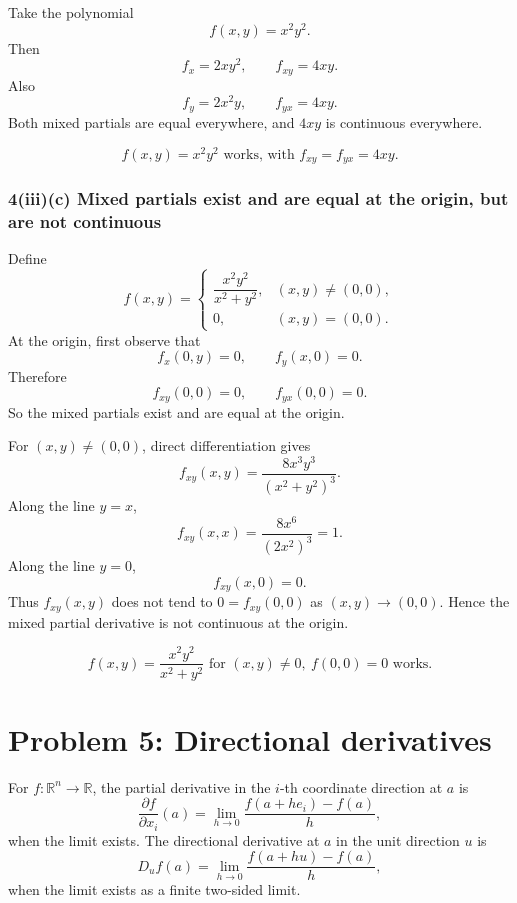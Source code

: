 \documentclass[11pt]{article}
\newcommand{\R}{\mathbb{R}}
\begin{document}
Take the polynomial
\[
f(x,y)=x^2y^2.
\]
Then
\[
f_x=2xy^2,
\qquad
f_{xy}=4xy.
\]
Also
\[
f_y=2x^2y,
\qquad
f_{yx}=4xy.
\]
Both mixed partials are equal everywhere, and \(4xy\) is continuous everywhere.

\begin{answerbox}
\[
\boxed{f(x,y)=x^2y^2\text{ works, with }f_{xy}=f_{yx}=4xy.}
\]
\end{answerbox}

\subsubsection*{4(iii)(c) Mixed partials exist and are equal at the origin, but are not continuous}

Define
\[
f(x,y)=
\begin{cases}
\dfrac{x^2y^2}{x^2+y^2},&(x,y)\neq(0,0),\\[6pt]
0,&(x,y)=(0,0).
\end{cases}
\]
At the origin, first observe that
\[
f_x(0,y)=0,
\qquad
f_y(x,0)=0.
\]
Therefore
\[
f_{xy}(0,0)=0,
\qquad
f_{yx}(0,0)=0.
\]
So the mixed partials exist and are equal at the origin.

For \((x,y)\neq(0,0)\), direct differentiation gives
\[
f_{xy}(x,y)=\frac{8x^3y^3}{(x^2+y^2)^3}.
\]
Along the line \(y=x\),
\[
f_{xy}(x,x)=\frac{8x^6}{(2x^2)^3}=1.
\]
Along the line \(y=0\),
\[
f_{xy}(x,0)=0.
\]
Thus \(f_{xy}(x,y)\) does not tend to \(0=f_{xy}(0,0)\) as \((x,y)\to(0,0)\). Hence the mixed partial derivative is not continuous at the origin.

\begin{answerbox}
\[
\boxed{f(x,y)=\frac{x^2y^2}{x^2+y^2}\text{ for }(x,y)\neq0,\ f(0,0)=0\text{ works}.}
\]
\end{answerbox}

\newpage
\section{Problem 5: Directional derivatives}

\begin{strategybox}
For \(f:\R^n\to\R\), the partial derivative in the \(i\)-th coordinate direction at \(a\) is
\[
\frac{\partial f}{\partial x_i}(a)=\lim_{h\to0}\frac{f(a+h e_i)-f(a)}{h},
\]
when the limit exists. The directional derivative at \(a\) in the unit direction \(u\) is
\[
D_u f(a)=\lim_{h\to0}\frac{f(a+hu)-f(a)}{h},
\]
when the limit exists as a finite two-sided limit.
\end{strategybox}
\end{document}
